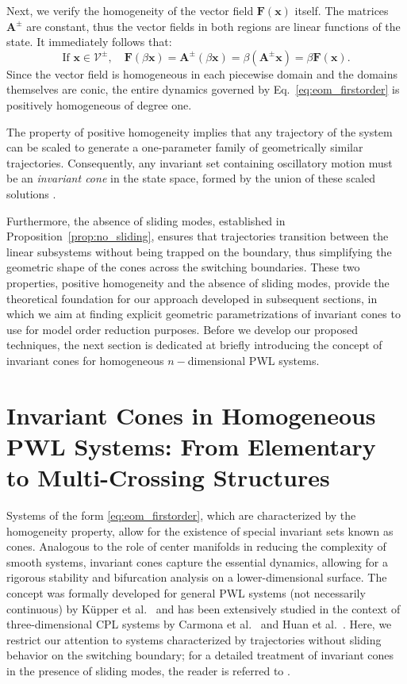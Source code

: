 \documentclass[a4paper,9pt,parskip=half,english]{article}
\theoremstyle{plain}
\theoremstyle{definition}
\newcommand{\vx}{\mathbf x}
\newcommand{\vA}{\mathbf A}
\newcommand{\vF}{\mathbf F}
\begin{document}
Next, we verify the homogeneity of the vector field $\vF(\vx)$ itself. The matrices $\vA^{\pm}$ are constant, thus the vector fields in both regions are linear functions of the state. It immediately follows that:
\begin{equation}
	\text{If } \vx \in \mathcal{V}^{\pm}, \quad \vF(\beta \vx) = \vA^{\pm}(\beta \vx) = \beta(\vA^{\pm}\vx) = \beta \vF(\vx).
\end{equation}
Since the vector field is homogeneous in each piecewise domain and the domains themselves are conic, the entire dynamics governed by Eq.~\eqref{eq:eom_firstorder} is positively homogeneous of degree one.

The property of positive homogeneity implies that any trajectory of the system can be scaled to generate a one-parameter family of geometrically similar trajectories. Consequently, any invariant set containing oscillatory motion must be an \textit{invariant cone} in the state space, formed by the union of these scaled solutions \cite{Kuepper2008, Karoui2025}.

Furthermore, the absence of sliding modes, established in Proposition~\ref{prop:no_sliding}, ensures that trajectories transition between the linear subsystems without being trapped on the boundary, thus simplifying the geometric shape of the cones across the switching boundaries. These two properties, positive homogeneity and the absence of sliding modes, provide the theoretical foundation for our approach developed in subsequent sections, in which we aim at finding explicit geometric parametrizations of invariant cones to use for model order reduction purposes. Before we develop our proposed techniques, the next section is dedicated at briefly introducing the concept of invariant cones for homogeneous $n-$dimensional PWL systems.

\section{Invariant Cones in Homogeneous PWL Systems: From Elementary to Multi-Crossing Structures}\label{section:invcones}
Systems of the form \eqref{eq:eom_firstorder}, which are characterized by the homogeneity property, allow for the existence of special invariant sets known as cones. Analogous to the role of center manifolds in reducing the complexity of smooth systems, invariant cones capture the essential dynamics, allowing for a rigorous stability and bifurcation analysis on a lower-dimensional surface. The concept was formally developed for general PWL systems (not necessarily continuous) by Küpper et al.~\cite{Kuepper2008, Kuepper2011, Weiss2012} and has been extensively studied in the context of three-dimensional CPL systems by Carmona et al.~\cite{carmona2005bifurcation, Carmona2006} and Huan et al.~\cite{Huan2016,Huan2017,Huan2017a}. Here, we restrict our attention to systems characterized by trajectories without sliding behavior on the switching boundary; for a detailed treatment of invariant cones in the presence of sliding modes, the reader is referred to \cite{Weiss2015}. 
\end{document}
